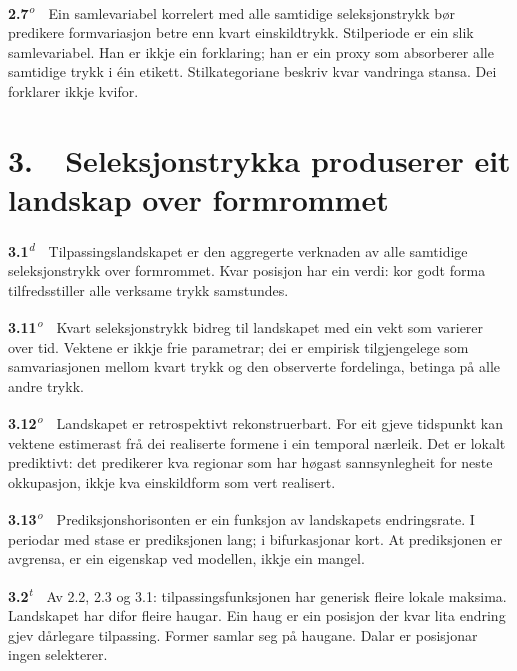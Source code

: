 \documentclass[10pt]{article}
\begin{document}
\noindent\textbf{2.7}\textsuperscript{\textit{o}}~~Ein samlevariabel korrelert med alle samtidige seleksjonstrykk bør predikere formvariasjon betre enn kvart einskildtrykk. Stilperiode er ein slik samlevariabel. Han er ikkje ein forklaring; han er ein proxy som absorberer alle samtidige trykk i éin etikett. Stilkategoriane beskriv kvar vandringa stansa. Dei forklarer ikkje kvifor.







\chapter*{3.~~Seleksjonstrykka produserer eit landskap over formrommet}




\noindent\textbf{3.1}\textsuperscript{\textit{d}}~~Tilpassingslandskapet er den aggregerte verknaden av alle samtidige seleksjonstrykk over formrommet. Kvar posisjon har ein verdi: kor godt forma tilfredsstiller alle verksame trykk samstundes.




\noindent\textbf{3.11}\textsuperscript{\textit{o}}~~Kvart seleksjonstrykk bidreg til landskapet med ein vekt som varierer over tid. Vektene er ikkje frie parametrar; dei er empirisk tilgjengelege som samvariasjonen mellom kvart trykk og den observerte fordelinga, betinga på alle andre trykk.




\noindent\textbf{3.12}\textsuperscript{\textit{o}}~~Landskapet er retrospektivt rekonstruerbart. For eit gjeve tidspunkt kan vektene estimerast frå dei realiserte formene i ein temporal nærleik. Det er lokalt prediktivt: det predikerer kva regionar som har høgast sannsynlegheit for neste okkupasjon, ikkje kva einskildform som vert realisert.




\noindent\textbf{3.13}\textsuperscript{\textit{o}}~~Prediksjonshorisonten er ein funksjon av landskapets endringsrate. I periodar med stase er prediksjonen lang; i bifurkasjonar kort. At prediksjonen er avgrensa, er ein eigenskap ved modellen, ikkje ein mangel.




\noindent\textbf{3.2}\textsuperscript{\textit{t}}~~Av 2.2, 2.3 og 3.1: tilpassingsfunksjonen har generisk fleire lokale maksima. Landskapet har difor fleire haugar. Ein haug er ein posisjon der kvar lita endring gjev dårlegare tilpassing. Former samlar seg på haugane. Dalar er posisjonar ingen selekterer.
\end{document}
